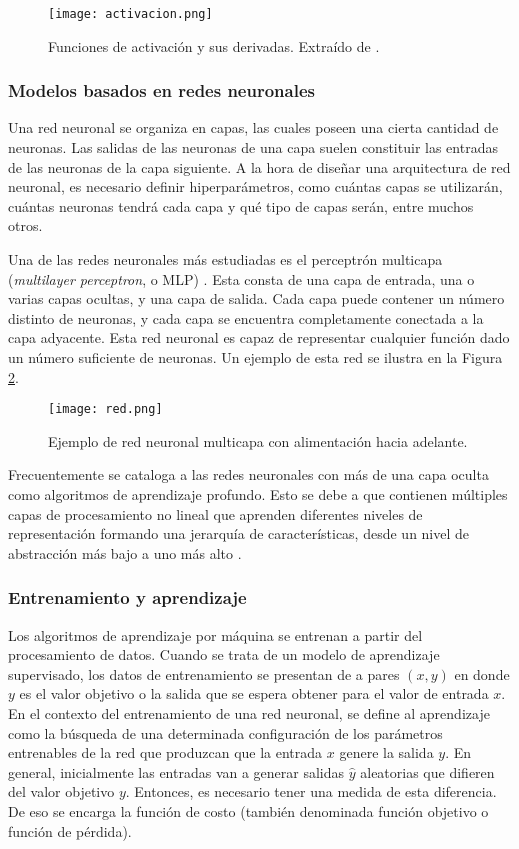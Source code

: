 \begin{figure}[H]
  \centering{}
  \texttt{[image: activacion.png]}
  \caption{Funciones de activación y sus derivadas. Extraído de \cite{lagartija}.}
  \label{fig:activación}
\end{figure}

\subsubsection{Modelos basados en redes neuronales}

Una red neuronal se organiza en capas, las cuales poseen una cierta cantidad de neuronas. Las salidas de las neuronas de una capa suelen constituir las entradas de las neuronas de la capa siguiente. A la hora de diseñar una arquitectura de red neuronal, es necesario definir hiperparámetros, como cuántas capas se utilizarán, cuántas neuronas tendrá cada capa y qué tipo de capas serán, entre muchos otros.

Una de las redes neuronales más estudiadas es el perceptrón multicapa (\textit{multilayer perceptron}, o MLP) \cite{MLP2}. Esta consta de una capa de entrada, una o varias capas ocultas, y una capa de salida. Cada capa puede contener un número distinto de neuronas, y cada capa se encuentra completamente conectada a la capa adyacente. Esta red neuronal es capaz de representar cualquier función dado un número suficiente de neuronas. Un ejemplo de esta red se ilustra en la Figura \ref{fig:red}.

\begin{figure}[H]
  \centering{}
  \texttt{[image: red.png]}
  \caption{Ejemplo de red neuronal multicapa con alimentación hacia adelante.}
  \label{fig:red}
\end{figure}

Frecuentemente se cataloga a las redes neuronales con más de una capa oculta como algoritmos de aprendizaje profundo. Esto se debe a que contienen múltiples capas de procesamiento no lineal que aprenden diferentes niveles de representación formando una jerarquía de características, desde un nivel de abstracción más bajo a uno más alto \cite{franchute}.  

\subsubsection{Entrenamiento y aprendizaje}

Los algoritmos de aprendizaje por máquina se entrenan a partir del procesamiento de datos. Cuando se trata de un modelo de aprendizaje supervisado, los datos de entrenamiento se presentan de a pares $(x,y)$ en donde $y$ es el valor objetivo o la salida que se espera obtener para el valor de entrada $x$. En el contexto del entrenamiento de una red neuronal, se define al aprendizaje como la búsqueda de una determinada configuración de los parámetros entrenables de la red que produzcan que la entrada $x$ genere la salida $y$. En general, inicialmente las entradas van a generar salidas $\hat{y}$ aleatorias que difieren del valor objetivo $y$. Entonces, es necesario tener una medida de esta diferencia. De eso se encarga la función de costo (también denominada función objetivo o función de pérdida).

